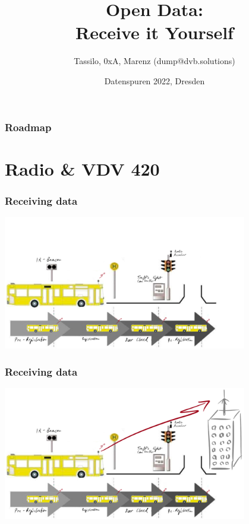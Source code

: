 \documentclass[aspectratio=169]{beamer}
\title{Open Data: \\ Receive it Yourself}
\date[ISPN ’80]{Datenspuren 2022, Dresden}
\author[]{Tassilo, 0xA, Marenz (dump@dvb.solutions)}
\begin{document}
\begin{frame}\titlepage
\end{frame}
  
\begin{frame} 
\frametitle{Roadmap} 

\tableofcontents

\end{frame}

\section{Radio \& VDV 420}


\begin{frame}
\frametitle{Receiving data}
\centering
\includegraphics[width=0.8\textwidth]{figs/lsa-beeinflussungs-stecke.pdf}
\end{frame}


\begin{frame}
\frametitle{Receiving data}
\centering
\includegraphics[width=0.8\textwidth]{figs/lsa-beeinflussungs-stecke-mit-antenne.pdf}
\end{frame}
\end{document}
